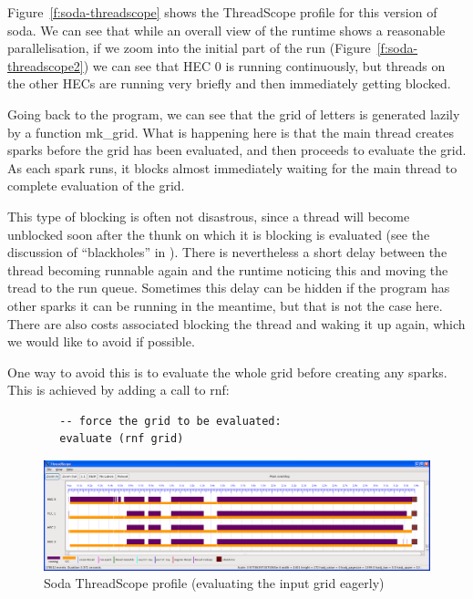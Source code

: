 \documentclass[twocolumn,9pt]{sigplanconf}
\newcommand{\codef}[1]{{\fontfamily{cmss}\small#1}}
\begin{document}
Figure~\ref{f:soda-threadscope} shows the ThreadScope profile for this
version of soda.  We can see that while an overall view of the runtime
shows a reasonable parallelisation, if we zoom into the initial part
of the run (Figure~\ref{f:soda-threadscope2}) we can see that HEC 0 is
running continuously, but threads on the other HECs are running very
briefly and then immediately getting blocked.

Going back to the program, we can see that the grid of letters is
generated lazily by a function \codef{mk\_grid}.  What is happening here is
that the main thread creates sparks before the grid has been
evaluated, and then proceeds to evaluate the grid.  As each spark
runs, it blocks almost immediately waiting for the main thread to
complete evaluation of the grid.

This type of blocking is often not disastrous, since a thread will become
unblocked soon after the thunk on which it is blocking is evaluated
(see the discussion of ``blackholes'' in \citet{multicore-ghc}).  There
is nevertheless a short delay between the thread becoming runnable
again and the runtime noticing this and moving the tread to the run
queue.  Sometimes this delay can be hidden if the program has other
sparks it can be running in the meantime, but that is not the case
here.  There are also costs associated blocking the thread and waking
it up again, which we would like to avoid if possible.

One way to avoid this is to evaluate the whole grid before creating
any sparks.  This is achieved by adding a call to \codef{rnf}:

\begin{lstlisting}
        -- force the grid to be evaluated:
        evaluate (rnf grid)
\end{lstlisting}

\begin{figure}
\begin{center}
\includegraphics[scale=0.3]{soda3.png}
\end{center}
\caption{Soda ThreadScope profile (evaluating the input grid eagerly)}
\label{f:soda-threadscope3}
\end{figure}
\end{document}
